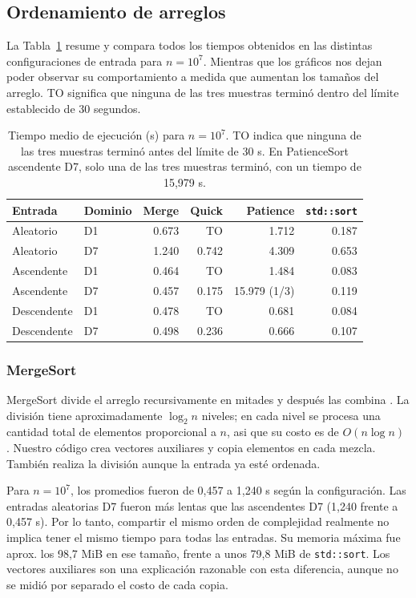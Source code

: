 \subsection{Ordenamiento de arreglos}
La Tabla~\ref{tab:sorting} resume y compara todos los tiempos obtenidos en las 
distintas configuraciones de entrada para $n=10^7$. Mientras que los gráficos nos dejan
poder observar su comportamiento a medida que aumentan los tamaños del arreglo.
TO significa que ninguna de las tres muestras terminó dentro del límite establecido 
de 30 segundos.

\begin{table}[H]
\centering\small
\begin{tabular}{llrrrr}
\hline
Entrada & Dominio & Merge & Quick & Patience & \texttt{std::sort}\\
\hline
Aleatorio   & D1 & 0.673 & TO & 1.712 & 0.187 \\
Aleatorio   & D7 & 1.240 & 0.742 & 4.309 & 0.653 \\
Ascendente  & D1 & 0.464 & TO & 1.484 & 0.083 \\
Ascendente  & D7 & 0.457 & 0.175 & 15.979 (1/3) & 0.119 \\
Descendente & D1 & 0.478 & TO & 0.681 & 0.084 \\
Descendente & D7 & 0.498 & 0.236 & 0.666 & 0.107 \\
\hline
\end{tabular}

\caption{Tiempo medio de ejecución (s) para $n=10^7$. TO indica que ninguna
de las tres muestras terminó antes del límite de 30 s. En PatienceSort
ascendente D7, solo una de las tres muestras terminó, con un tiempo de
15,979 s.}
\label{tab:sorting}
\end{table}

\subsubsection{MergeSort}
MergeSort divide el arreglo recursivamente en mitades y después las combina 
\cite{geeksforgeeks_mergesort}. La división tiene aproximadamente $\log_2 n$
niveles; en cada nivel se procesa una cantidad total de elementos
proporcional a $n$, asi que su costo es de $O(n\log n)$ \cite{algorithms_erickson}.
Nuestro código crea vectores auxiliares y copia elementos en cada mezcla.
También realiza la división aunque la entrada ya esté ordenada.

Para $n=10^7$, los promedios fueron de 0,457 a 1,240 s según la configuración.
Las entradas aleatorias D7 fueron más lentas que las ascendentes D7
(1,240 frente a 0,457 s). Por lo tanto, compartir el mismo orden de complejidad
realmente no implica tener el mismo tiempo para todas las entradas. Su memoria máxima
fue aprox. los 98,7 MiB en ese tamaño, frente a unos 79,8 MiB de \texttt{std::sort}.
Los vectores auxiliares son una explicación razonable con esta diferencia,
aunque no se midió por separado el costo de cada copia.

